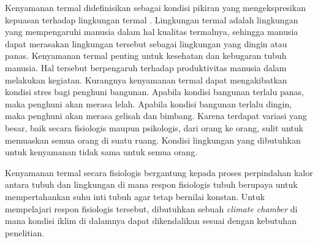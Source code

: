Kenyamanan termal didefinisikan sebagai kondisi pikiran yang mengekspresikan kepuasan terhadap lingkungan termal \cite{ASHRAE55}. Lingkungan termal adalah lingkungan yang mempengaruhi manusia dalam hal kualitas termalnya, sehingga manusia dapat merasakan lingkungan tersebut sebagai lingkungan yang dingin atau panas. Kenyamanan termal penting untuk kesehatan dan kebugaran tubuh manusia. Hal tersebut berpengaruh terhadap produktivitas manusia dalam melakukan kegiatan. Kurangnya kenyamanan termal dapat mengakibatkan kondisi stres bagi penghuni bangunan. Apabila kondisi bangunan terlalu panas, maka penghuni akan merasa lelah. Apabila kondisi bangunan terlalu dingin, maka penghuni akan merasa gelisah dan bimbang. Karena terdapat variasi yang besar, baik secara fisiologis maupun psikologis, dari orang ke orang, sulit untuk memuaskan semua orang di suatu ruang. Kondisi lingkungan yang dibutuhkan untuk kenyamanan tidak sama untuk semua orang. 

Kenyamanan termal secara fisiologis bergantung kepada proses perpindahan kalor antara tubuh dan lingkungan di mana respon fisiologis tubuh berupaya untuk mempertahankan suhu inti tubuh agar tetap bernilai konstan. Untuk mempelajari respon fisiologis tersebut, dibutuhkan sebuah \textit{climate chamber} di mana kondisi iklim di dalamnya dapat dikendalikan sesuai dengan kebutuhan penelitian.



